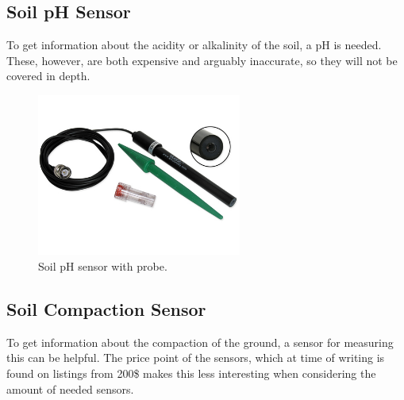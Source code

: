 \subsection{Soil pH Sensor} 
To get information about the acidity or alkalinity of the soil, a pH is needed. These, however, are both expensive and arguably inaccurate, so they will not be covered in depth. 

\begin{figure}[H]
\centering
\includegraphics[width=0.6\textwidth]{chapters/analysis/figs/soilPhProbe.jpg}
\caption{Soil pH sensor with probe.}
\label{fig:phSensor}
\end{figure}

\subsection{Soil Compaction Sensor}
To get information about the compaction of the ground, a sensor for measuring this can be helpful. %
The price point of the sensors, which at time of writing is found on listings from 200\$ makes this less interesting when considering the amount of needed sensors. %
